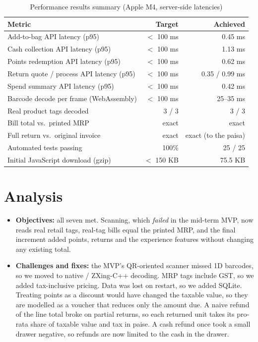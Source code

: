 \documentclass[12pt,letterpaper,twoside,openany]{report}
\begin{document}
\begin{table}[!htb]
  \centering
  \small
  \begin{tabular}{|l|r|r|}
    \hline
    \textbf{Metric} & \textbf{Target} & \textbf{Achieved} \\ \hline
    Add-to-bag API latency (p95) & $<$ 100 ms & 0.45 ms \\ \hline
    Cash collection API latency (p95) & $<$ 100 ms & 1.13 ms \\ \hline
    Points redemption API latency (p95) & $<$ 100 ms & 0.62 ms \\ \hline
    Return quote / process API latency (p95) & $<$ 100 ms & 0.35 / 0.99 ms \\ \hline
    Spend summary API latency (p95) & $<$ 100 ms & 0.42 ms \\ \hline
    Barcode decode per frame (WebAssembly) & $<$ 100 ms & 25--35 ms \\ \hline
    Real product tags decoded & 3 / 3 & 3 / 3 \\ \hline
    Bill total vs.\ printed MRP & exact & exact \\ \hline
    Full return vs.\ original invoice & exact & exact (to the paisa) \\ \hline
    Automated tests passing & 100\% & 25 / 25 \\ \hline
    Initial JavaScript download (gzip) & $<$ 150 KB & 75.5 KB \\ \hline
  \end{tabular}
  \caption{Performance results summary (Apple M4, server-side latencies)}
  \label{tab:results}
\end{table}

\section{Analysis}
\begin{itemize}[leftmargin=*]
  \item \textbf{Objectives:} all seven met. Scanning, which \emph{failed} in the mid-term MVP,
        now reads real retail tags, real-tag bills equal the printed MRP, and the final
        increment added points, returns and the experience features without changing any
        existing total.
  \item \textbf{Challenges and fixes:} the MVP's QR-oriented scanner missed 1D barcodes, so we
        moved to native / ZXing-C++ decoding. MRP tags include GST, so we added tax-inclusive
        pricing. Data was lost on restart, so we added SQLite. Treating points as a discount
        would have changed the taxable value, so they are modelled as a voucher that reduces
        only the amount due. A naive refund of the line total broke on partial returns, so each
        returned unit takes its pro-rata share of taxable value and tax in paise. A cash refund
        once took a small drawer negative, so refunds are now limited to the cash in the drawer.
\end{itemize}
\end{document}
